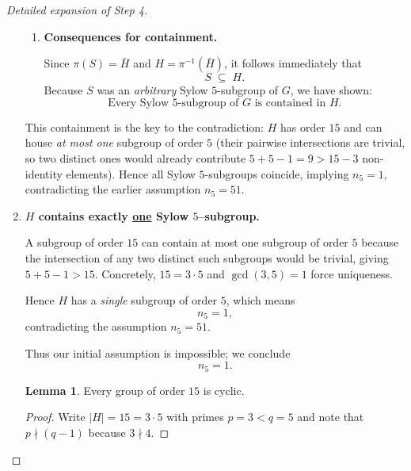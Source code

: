 \documentclass[12pt]{article}
\theoremstyle{definition} %
\newtheorem{lemma}{Lemma}
\theoremstyle{plain} %
\begin{document}
\begin{proof}[Detailed expansion of Step 4]
\begin{enumerate}
\begin{enumerate}
\item \textbf{Consequences for containment.}

      Since \(\pi(S)=\bar{H}\)
      and \(H=\pi^{-1}(\bar{H})\),
      it follows immediately that
      \[
          S \;\subseteq\; H.
      \]
      Because \(S\) was an \emph{arbitrary} Sylow \(5\)-subgroup of \(G\),
      we have shown:
      \[
          \boxed{\;
            \text{Every Sylow }5\text{-subgroup of }G
            \text{ is contained in }H.
          \;}
      \]
\end{enumerate}

\noindent
This containment is the key to the contradiction:  
\(H\) has order \(15\) and can house \emph{at most one} subgroup of
order \(5\) (their pairwise intersections are trivial, so two distinct
ones would already contribute \(5+5-1=9>15-3\) non-identity elements).
Hence all Sylow \(5\)-subgroups coincide, implying \(n_{5}=1\),
contradicting the earlier assumption \(n_{5}=51\).
  \item \textbf{$H$ contains exactly \underline{one} Sylow $5$–subgroup.}
  
        A subgroup of order $15$ can contain at most one subgroup of
        order $5$ because the intersection of any two distinct such
        subgroups would be trivial, giving $5+5-1>15$.  Concretely,
        $15 = 3\cdot5$ and $\gcd(3,5)=1$ force uniqueness.
  
        Hence $H$ has a \emph{single} subgroup of order $5$, which means
        $$
            n_{5}=1,
        $$
        contradicting the assumption $n_{5}=51$.
  
        Thus our initial assumption is impossible; we conclude
        $$
            n_{5}=1.
        $$

\begin{lemma}\label{lem:15-cyclic}
  Every group of order $15$ is cyclic.
  \end{lemma}
  
  \begin{proof}
  Write $|H|=15 = 3\cdot 5$ with primes $p=3<q=5$ and note that
  $p\nmid(q-1)$ because $3\nmid 4$.
  

\end{proof}
\end{enumerate}
\end{proof}
\end{document}
